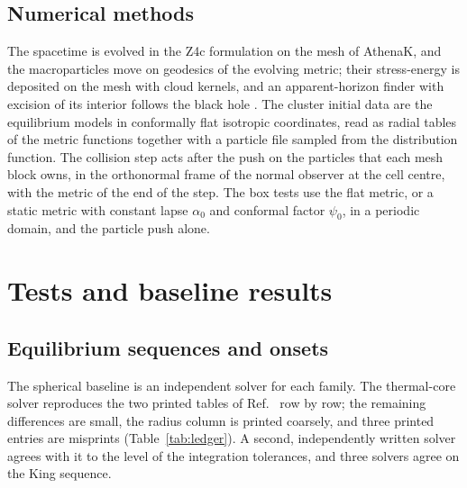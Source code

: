 \documentclass[aps,prd,twocolumn,10pt,superscriptaddress,nofootinbib,longbibliography,floatfix]{revtex4-2}
\begin{document}
\subsection{Numerical methods}\label{sec:methods}

The spacetime is evolved in the Z4c formulation on the mesh of AthenaK, and the macroparticles move on geodesics of the evolving metric; their stress-energy is deposited on the mesh with cloud kernels, and an apparent-horizon finder with excision of its interior follows the black hole \cite{Wu:2026nrpic}. The cluster initial data are the equilibrium models in conformally flat isotropic coordinates, read as radial tables of the metric functions together with a particle file sampled from the distribution function. The collision step acts after the push on the particles that each mesh block owns, in the orthonormal frame of the normal observer at the cell centre, with the metric of the end of the step. The box tests use the flat metric, or a static metric with constant lapse $\alpha_0$ and conformal factor $\psi_0$, in a periodic domain, and the particle push alone.

\section{Tests and baseline results}\label{sec:tests}

\subsection{Equilibrium sequences and onsets}\label{sec:t-sequences}

The spherical baseline is an independent solver for each family. The thermal-core solver reproduces the two printed tables of Ref.~\cite{Feng:2021instab} row by row; the remaining differences are small, the radius column is printed coarsely, and three printed entries are misprints (Table~\ref{tab:ledger}). A second, independently written solver agrees with it to the level of the integration tolerances, and three solvers agree on the King sequence.
\end{document}
